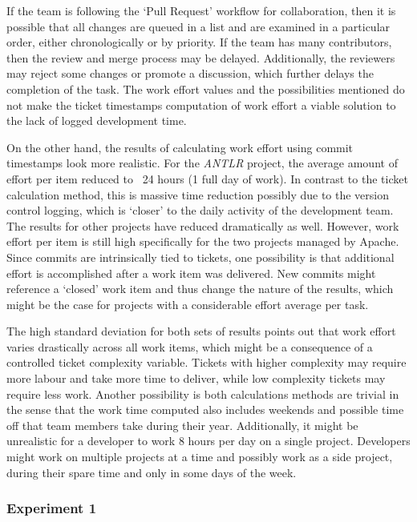 \documentclass{mpaper}
\begin{document}
If the team is following the `Pull Request' workflow for collaboration, then it
is possible that all changes are queued in a list and are examined in a
particular order, either chronologically or by priority. If the team has many
contributors, then the review and merge process may be delayed. Additionally,
the reviewers may reject some changes or promote a discussion, which further
delays the completion of the task. The work effort values and the possibilities
mentioned do not make the ticket timestamps computation of work effort a viable
solution to the lack of logged development time.

On the other hand, the results of calculating work effort using commit
timestamps look more realistic. For the \emph{ANTLR} project, the average amount
of effort per item reduced to ~24 hours (1 full day of work). In contrast to the
ticket calculation method, this is massive time reduction possibly due to the
version control logging, which is `closer' to the daily activity of the
development team. The results for other projects have reduced dramatically as
well. However, work effort per item is still high specifically for the two
projects managed by Apache. Since commits are intrinsically tied to tickets, one
possibility is that additional effort is accomplished after a work item was
delivered. New commits might reference a `closed' work item and thus change the
nature of the results, which might be the case for projects with a considerable
effort average per task.

The high standard deviation for both sets of results points out that work effort
varies drastically across all work items, which might be a consequence of a
controlled ticket complexity variable. Tickets with higher complexity may
require more labour and take more time to deliver, while low complexity tickets
may require less work. Another possibility is both calculations methods are
trivial in the sense that the work time computed also includes weekends and
possible time off that team members take during their year. Additionally, it
might be unrealistic for a developer to work 8 hours per day on a single
project. Developers might work on multiple projects at a time and possibly work
as a side project, during their spare time and only in some days of the week.

\subsubsection*{Experiment 1}
\label{experiment-1}
\end{document}
